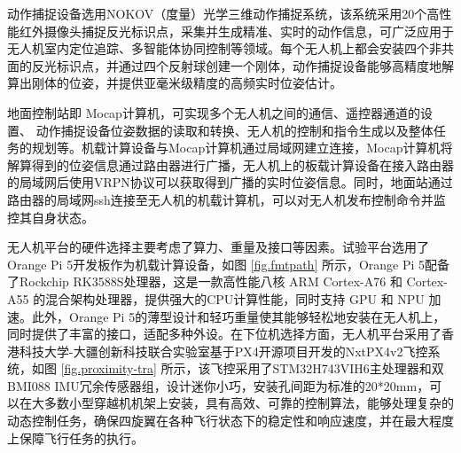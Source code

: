 \documentclass[lang=chs, degree=master, blindreview=true, winfonts=true]{yanputhesis}
\begin{document}
动作捕捉设备选用NOKOV（度量）光学三维动作捕捉系统，该系统采用20个高性能红外摄像头捕捉反光标识点，采集并生成精准、实时的动作信息，可广泛应用于无人机室内定位追踪、多智能体协同控制等领域。每个无人机上都会安装四个非共面的反光标识点，并通过四个反射球创建一个刚体，动作捕捉设备能够高精度地解算出刚体的位姿，并提供亚毫米级精度的高频实时位姿估计。

地面控制站即 Mocap计算机，可实现多个无人机之间的通信、遥控器通道的设置、 动作捕捉设备位姿数据的读取和转换、无人机的控制和指令生成以及整体任务的规划等。机载计算设备与Mocap计算机通过局域网建立连接，Mocap计算机将解算得到的位姿信息通过路由器进行广播，无人机上的板载计算设备在接入路由器的局域网后使用VRPN协议可以获取得到广播的实时位姿信息。同时，地面站通过路由器的局域网ssh连接至无人机的机载计算机，可以对无人机发布控制命令并监控其自身状态。

无人机平台的硬件选择主要考虑了算力、重量及接口等因素。试验平台选用了Orange Pi 5开发板作为机载计算设备，如图 \ref{fig.fmtpath} 所示，Orange Pi 5配备了Rockchip RK3588S处理器，这是一款高性能八核 ARM Cortex-A76 和 Cortex-A55 的混合架构处理器，提供强大的CPU计算性能，同时支持 GPU 和 NPU 加速。此外，Orange Pi 5的薄型设计和轻巧重量使其能够轻松地安装在无人机上，同时提供了丰富的接口，适配多种外设。在下位机选择方面，无人机平台采用了香港科技大学-大疆创新科技联合实验室基于PX4开源项目开发的NxtPX4v2飞控系统，如图 \ref{fig.proximity-tra} 所示，该飞控采用了STM32H743VIH6主处理器和双BMI088 IMU冗余传感器组，设计迷你小巧，安装孔间距为标准的20*20mm，可以在大多数小型穿越机机架上安装，具有高效、可靠的控制算法，能够处理复杂的动态控制任务，确保四旋翼在各种飞行状态下的稳定性和响应速度，并在最大程度上保障飞行任务的执行。
\end{document}
